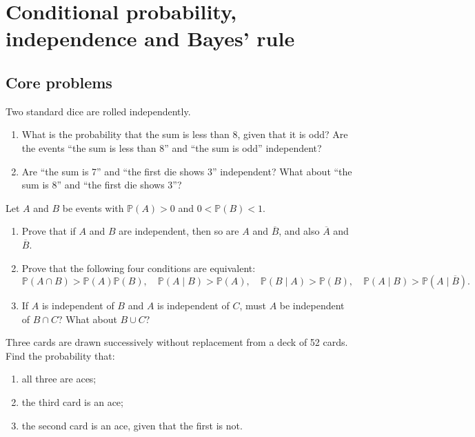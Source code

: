 \documentclass[11pt,a4paper]{article}
\newenvironment{enumeratea}{\begin{enumerate}[label=(\alph*),itemsep=0.28em,topsep=0.25em]}{\end{enumerate}}
\newcommand{\Pbb}{\mathbb P}
\newcounter{problem}[section]
\begin{document}
\section{Conditional probability, independence and Bayes' rule}
\subsection*{Core problems}
\begin{problembook}
Two standard dice are rolled independently.
\begin{enumeratea}
  \item What is the probability that the sum is less than 8, given that it is odd?
  Are the events ``the sum is less than 8'' and ``the sum is odd'' independent?
  \item Are ``the sum is 7'' and ``the first die shows 3'' independent?
  What about ``the sum is 8'' and ``the first die shows 3''?
\end{enumeratea}
\end{problembook}
\begin{problem}
Let $A$ and $B$ be events with $\Pbb(A)>0$ and $0<\Pbb(B)<1$.
\begin{enumeratea}
  \item Prove that if $A$ and $B$ are independent, then so are $A$ and $\overline{B}$,
  and also $\overline{A}$ and $\overline{B}$.
  \item Prove that the following four conditions are equivalent:
  \[
  \Pbb(A\cap B)>\Pbb(A)\Pbb(B),\quad
  \Pbb(A\mid B)>\Pbb(A),\quad
  \Pbb(B\mid A)>\Pbb(B),\quad
  \Pbb(A\mid B)>\Pbb(A\mid \overline{B}).
  \]
  \item If $A$ is independent of $B$ and $A$ is independent of $C$, must $A$ be
  independent of $B\cap C$? What about $B\cup C$?
\end{enumeratea}
\end{problem}
\begin{problembook}
Three cards are drawn successively without replacement from a deck of 52 cards.
Find the probability that:
\begin{enumeratea}
  \item all three are aces;
  \item the third card is an ace;
  \item the second card is an ace, given that the first is not.
\end{enumeratea}
\end{problembook}
\end{document}
